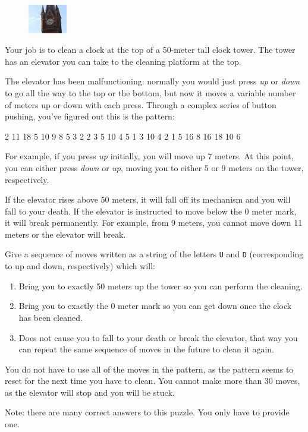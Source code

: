 \documentclass{puzz}
\begin{document}

\begin{figure}
    \centering
    \includegraphics[width=0.15\textwidth]{graphics/clocktower}
\end{figure}

Your job is to clean a clock at the top of a 50-meter tall clock tower. The
tower has an elevator you can take to the cleaning platform at the top.

The elevator has been malfunctioning: normally you would just press \emph{up}
or \emph{down} to go all the way to the top or the bottom, but now it moves a
variable number of meters up or down with each press. Through a complex series
of button pushing, you've figured out this is the pattern:

\begin{center}
     2 11 18 5 10 9 8 5 3 2 2 3 5 10 4 5 1 3 10 4 2 1 5 16 8 16 18 10 6
\end{center}

For example, if you press \emph{up} initially, you will move up 7 meters. At
this point, you can either press \emph{down} or \emph{up}, moving you to
either 5 or 9 meters on the tower, respectively.

If the elevator rises above 50 meters, it will fall off its mechanism and you
will fall to your death. If the elevator is instructed to move below the 0
meter mark, it will break permanently. For example, from 9 meters, you cannot
move down 11 meters or the elevator will break.

Give a sequence of moves written as a string of the letters \texttt{U} and
\texttt{D} (corresponding to up and down, respectively) which will:

\begin{enumerate}
    \item Bring you to exactly 50 meters up the tower so you can perform the
        cleaning.
    \item Bring you to exactly the 0 meter mark so you can get down once the
        clock has been cleaned.
    \item Does not cause you to fall to your death or break the elevator, that
        way you can repeat the same sequence of moves in the future to clean it
        again.
\end{enumerate}

You do not have to use all of the moves in the pattern, as the pattern seems to
reset for the next time you have to clean. You cannot make more than 30 moves,
as the elevator will stop and you will be stuck.

Note: there are many correct answers to this puzzle. You only have to provide
one.
\end{document}
